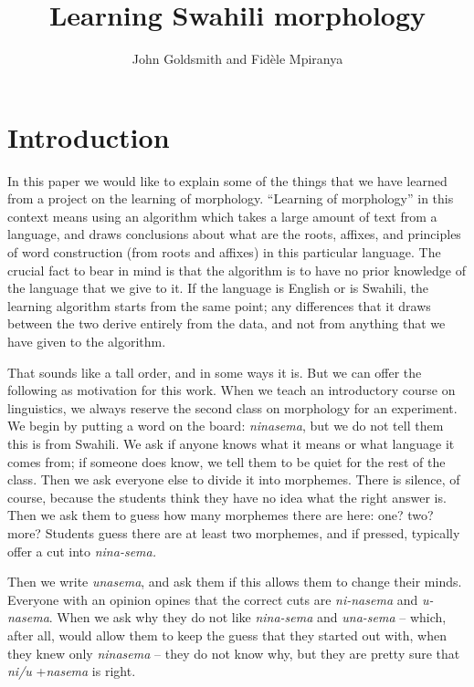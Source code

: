 \documentclass[output=paper,colorlinks,citecolor=brown]{langscibook}
\title{Learning Swahili morphology}
\author{John Goldsmith\affiliation{University of Chicago} and Fidèle Mpiranya\affiliation{University of Chicago}}
\begin{document}
\maketitle 

\section{Introduction}\label{sec:goldsmith:1}

In this paper we would like to explain some of the things that we have learned from a project on the learning of morphology. ``Learning of morphology'' in this context means using an algorithm which takes a large amount of text from a language, and draws conclusions about what are the roots, affixes, and principles of word construction (from roots and affixes) in this particular language. The crucial fact to bear in mind is that the algorithm is to have no prior knowledge of the language that we give to it. If the language is English or is Swahili, the learning algorithm starts from the same point; any differences that it draws between the two derive entirely from the data, and not from anything that we have given to the algorithm. 

That sounds like a tall order, and in some ways it is. But we can offer the following as motivation for this work. When we teach an introductory course on linguistics, we always reserve the second class on morphology for an experiment. We begin by putting a word on the board: \textit{ninasema}, but we do not tell them this is from Swahili. We ask if anyone knows what it means or what language it comes from; if someone does know, we tell them to be quiet for the rest of the class. Then we ask everyone else to divide it into morphemes. There is silence, of course, because the students think they have no idea what the right answer is. Then we ask them to guess how many morphemes there are here: one? two? more? Students guess there are at least two morphemes, and if pressed, typically offer a cut into \textit{nina-sema.}

Then we write \textit{unasema}, and ask them if this allows them to change their minds. Everyone with an opinion opines that the correct cuts are \textit{ni-nasema} and \textit{u-nasema}. When we ask why they do not like \textit{nina-sema} and \textit{una-sema} -- which, after all, would allow them to keep the guess that they started out with, when they knew only \textit{ninasema} -- they do not know why, but they are pretty sure that \textit{ni/u} +\textit{nasema} is right.
\end{document}
